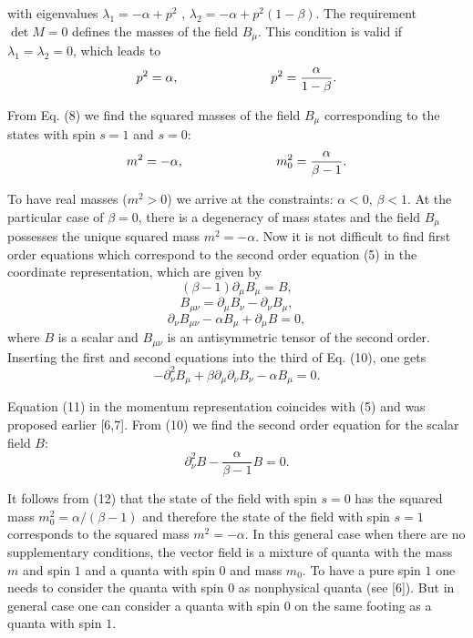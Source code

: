 \documentclass[a4paper,12pt]{article}
\begin{document}
with eigenvalues $\lambda _1=-\alpha +p^2$ , $\lambda _2=-\alpha +
p^2\left( 1-\beta \right) $. The requirement $\det M=0$ defines
the masses of the field $B_\mu $. This condition is valid if
$\lambda _1=\lambda _2=0$, which leads to
\begin{equation}
p^2=\alpha,\hspace{1.0in}p^2=\frac{\alpha }{1-\beta }. \label{8}
\end{equation}

From Eq. (8) we find the squared masses of the field $B_\mu $
corresponding to the states with spin $s=1$ and $s=0$:
\begin{equation}
m^2=-\alpha,\hspace{1.0in}m_0^2=\frac{\alpha }{\beta -1}.
\label{9}
\end{equation}

To have real masses ($m^2>0$) we arrive at the constraints:
$\alpha <0$, $ \beta <1$. At the particular case of $\beta =0$,
there is a degeneracy of mass states and the field $B_\mu $
possesses the unique squared mass $ m^2=-\alpha $. Now it is not
difficult to find first order equations which correspond to the
second order equation (5) in the coordinate representation, which
are given by
\[
\left( \beta -1\right) \partial _\mu B_\mu =B,
\]
\begin{equation}
B_{\mu \nu }=\partial _\mu B_\nu -\partial _\nu B_\mu, \label{10}
\end{equation}
\[
\partial _\nu B_{\mu \nu }-\alpha B_\mu +\partial _\mu B=0,
\]
where $B$ is a scalar and $B_{\mu \nu }$ is an antisymmetric
tensor of the second order. Inserting the first and second
equations into the third of Eq. (10), one gets
\begin{equation}
-\partial _\nu ^2B_\mu +\beta \partial _\mu \partial _\nu B_\nu
-\alpha B_\mu =0.  \label{11}
\end{equation}

Equation (11) in the momentum representation coincides with (5)
and was proposed earlier [6,7]. From (10) we find the second order
equation for the scalar field $B$:
\begin{equation}
\partial _\nu ^2B-\frac{\alpha }{\beta -1}B=0.  \label{12}
\end{equation}

It follows from (12) that the state of the field with spin $s=0$
has the squared mass $m_0^2=\alpha /\left( \beta -1\right) $ and
therefore the state of the field with spin $s=1$ corresponds to
the squared mass $ m^2=-\alpha $. In this general case when there
are no supplementary conditions, the vector field is a mixture of
quanta with the mass $m$ and spin $1$ and a quanta with spin $0$
and mass $m_0$. To have a pure spin $1$ one needs to consider the
quanta with spin $0$ as nonphysical quanta (see [6]). But in
general case one can consider a quanta with spin $0$ on the same
footing as a quanta with spin $1$.
\end{document}

